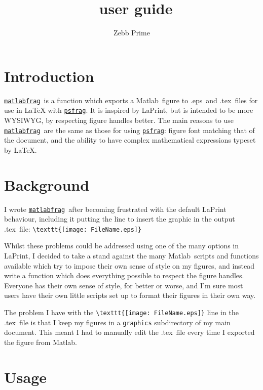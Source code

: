 \documentclass[a4paper,11pt]{article}
\title{\matlabfrag\ user guide}
\author{Zebb Prime}
\newcommand\matlabfrag{\href{http://www.mathworks.com/matlabcentral/fileexchange/21286}{{\tt matlabfrag}}}
\newcommand\psfragname{\href{http://www.ctan.org/tex-archive/help/Catalogue/entries/psfrag.html}{{\tt psfrag}}}
\newcommand\matlab{{\sc Matlab}}
\newcommand\tex{{\sc .tex}}
\newcommand\eps{{\sc .eps}}
\begin{document}
  \maketitle
  \tableofcontents
  \section{Introduction}%
    \matlabfrag\ is a function which exports a \matlab\ figure to \eps\ and \tex\ files for use in LaTeX
    with \psfragname. It is inspired by LaPrint, but is intended to be more WYSIWYG, by respecting figure
    handles better. The main reasons to use \matlabfrag\ are the same as those for using \psfragname: figure
    font matching that of the document, and the ability to have complex mathematical expressions typeset
    by LaTeX.
 
  \section{Background}%
    I wrote \matlabfrag\ after becoming frustrated with the default LaPrint behaviour, including it
    putting the line to insert the graphic in the output \tex\ file: \verb|\texttt{[image: FileName.eps]}|
    
    Whilst these problems could be addressed using one of the many options in LaPrint, I decided to
    take a stand against the many \matlab{}ripts and functions available which try to impose their
    own sense of style on my figures, and instead write a function which does everything possible to
    respect the figure handles. Everyone has their own sense of style, for better or worse, and I'm sure
    most users have their own little scripts set up to format their figures in their own way.
        
    The problem I have with the \verb|\texttt{[image: FileName.eps]}| line in the \tex\
    file is that I keep my figures in a {\tt graphics} subdirectory of my main document. This meant I had to
    manually edit the \tex\ file every time I exported the figure from \matlab.
    
  \section{Usage}%
\end{document}
